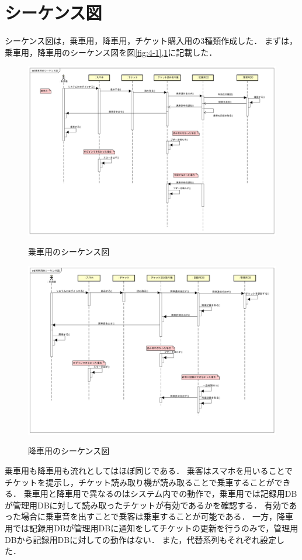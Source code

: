 \documentclass[documentclass]{jsarticle}
\begin{document}
\newpage
\section{シーケンス図}
シーケンス図は，乗車用，降車用，チケット購入用の3種類作成した．
まずは，乗車用，降車用のシーケンス図を図\ref*{fig:4-1},\ref*{fig:4-2}に記載した．
\begin{figure}[H]
  \begin{center}
    \includegraphics*[scale=0.3]{figure/4-1.png}
    \caption{乗車用のシーケンス図}
    \label{fig:4-1}
    \includegraphics*[scale=0.3]{figure/4-2.png}
    \caption{降車用のシーケンス図}
    \label{fig:4-2}
  \end{center}
\end{figure}
乗車用も降車用も流れとしてはほぼ同じである．
乗客はスマホを用いることでチケットを提示し，チケット読み取り機が読み取ることで乗車することができる．
乗車用と降車用で異なるのはシステム内での動作で，乗車用では記録用DBが管理用DBに対して読み取ったチケットが有効であるかを確認する．
有効であった場合に乗車音を出すことで乗客は乗車することが可能である．
一方，降車用では記録用DBが管理用DBに通知をしてチケットの更新を行うのみで，管理用DBから記録用DBに対しての動作はない．
また，代替系列もそれぞれ設定した．
\end{document}
